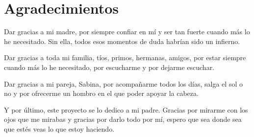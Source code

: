 \newpage
\chapter*{Agradecimientos}

Dar gracias a mi madre, por siempre confiar en mí y ser tan fuerte cuando más lo he necesitado. Sin ella, todos esos momentos de duda habrían sido un infierno.

Dar gracias a toda mi familia, tíos, primos, hermanas, amigos, por estar siempre cuando más lo he necesitado, por escucharme y por dejarme escuchar.

Dar gracias a mi pareja, Sabina, por acompañarme todos los días, salga el sol o no y por ofrecerme un hombro en el que poder apoyar la cabeza.

Y por último, este proyecto se lo dedico a mi padre. Gracias por mirarme con los ojos que me mirabas y gracias por darlo todo por mí, espero que sea donde sea que estés veas lo que estoy haciendo.
